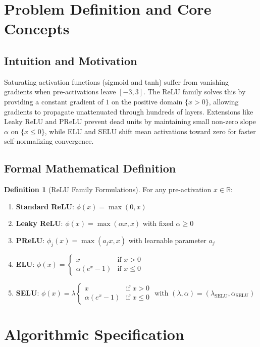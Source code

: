 \documentclass[11pt,a4paper]{article}
\theoremstyle{definition}
\newtheorem{definition}{Definition}[section]
\begin{document}
\section{Problem Definition and Core Concepts}

\subsection{Intuition and Motivation}
Saturating activation functions (sigmoid and tanh) suffer from vanishing gradients when pre-activations leave $[-3, 3]$. The ReLU family solves this by providing a constant gradient of $1$ on the positive domain $\{x > 0\}$, allowing gradients to propagate unattenuated through hundreds of layers. Extensions like Leaky ReLU and PReLU prevent dead units by maintaining small non-zero slope $\alpha$ on $\{x \le 0\}$, while ELU and SELU shift mean activations toward zero for faster self-normalizing convergence.

\subsection{Formal Mathematical Definition}
\begin{definition}[ReLU Family Formulations]
For any pre-activation $x \in \mathbb{R}$:
\begin{enumerate}
    \item \textbf{Standard ReLU}: $\phi(x) = \max(0, x)$
    \item \textbf{Leaky ReLU}: $\phi(x) = \max(\alpha x, x)$ with fixed $\alpha \ge 0$
    \item \textbf{PReLU}: $\phi_j(x) = \max(a_j x, x)$ with learnable parameter $a_j$
    \item \textbf{ELU}: $\phi(x) = \begin{cases} x & \text{if } x > 0 \\ \alpha (e^x - 1) & \text{if } x \le 0 \end{cases}$
    \item \textbf{SELU}: $\phi(x) = \lambda \begin{cases} x & \text{if } x > 0 \\ \alpha (e^x - 1) & \text{if } x \le 0 \end{cases}$ with $(\lambda, \alpha) = (\lambda_{\text{SELU}}, \alpha_{\text{SELU}})$
\end{enumerate}
\end{definition}

\section{Algorithmic Specification}
\end{document}
